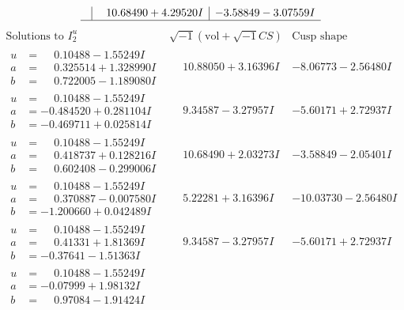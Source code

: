 \documentclass[1p]{elsarticle_modified}
\theoremstyle{definition}
\newcommand{\I}{\sqrt{-1}}
\begin{document}
$$\begin{array}{c|c|c}
 & \phantom{-}10.68490 + 4.29520 I & -3.58849 - 3.07559 I\\
 \hline 
 \end{array}$$\newpage$$\begin{array}{c|c|c}  
\text{Solutions to }I^u_{2}& \I (\text{vol} + \sqrt{-1}CS) & \text{Cusp shape}\\
 \hline 
\begin{aligned}
u &= \phantom{-}0.10488 - 1.55249 I \\
a &= \phantom{-}0.325514 + 1.328990 I \\
b &= \phantom{-}0.722005 - 1.189080 I\end{aligned}
 & \phantom{-}10.88050 + 3.16396 I & -8.06773 - 2.56480 I \\ \hline\begin{aligned}
u &= \phantom{-}0.10488 - 1.55249 I \\
a &= -0.484520 + 0.281104 I \\
b &= -0.469711 + 0.025814 I\end{aligned}
 & \phantom{-}9.34587 - 3.27957 I & -5.60171 + 2.72937 I \\ \hline\begin{aligned}
u &= \phantom{-}0.10488 - 1.55249 I \\
a &= \phantom{-}0.418737 + 0.128216 I \\
b &= \phantom{-}0.602408 - 0.299006 I\end{aligned}
 & \phantom{-}10.68490 + 2.03273 I & -3.58849 - 2.05401 I \\ \hline\begin{aligned}
u &= \phantom{-}0.10488 - 1.55249 I \\
a &= \phantom{-}0.370887 - 0.007580 I \\
b &= -1.200660 + 0.042489 I\end{aligned}
 & \phantom{-}5.22281 + 3.16396 I & -10.03730 - 2.56480 I \\ \hline\begin{aligned}
u &= \phantom{-}0.10488 - 1.55249 I \\
a &= \phantom{-}0.41331 + 1.81369 I \\
b &= -0.37641 - 1.51363 I\end{aligned}
 & \phantom{-}9.34587 - 3.27957 I & -5.60171 + 2.72937 I \\ \hline\begin{aligned}
u &= \phantom{-}0.10488 - 1.55249 I \\
a &= -0.07999 + 1.98132 I \\
b &= \phantom{-}0.97084 - 1.91424 I\end{aligned}

\end{array}$$
\end{document}
